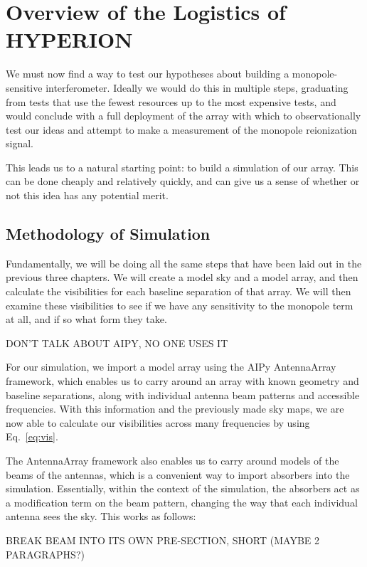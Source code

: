 \chapter{Overview of the Logistics of HYPERION}
\label{chap:logistics}

We must now find a way to test our hypotheses about building a 
monopole-sensitive interferometer. Ideally we would do this in multiple steps, 
graduating from tests that use the fewest resources up to the most expensive 
tests, and would conclude with a full deployment of the array with which to 
observationally test our ideas and attempt to make a measurement of the 
monopole reionization signal. 

This leads us to a natural starting point: to build a simulation of our array.  
This can be done cheaply and relatively quickly, and can give us a sense of 
whether or not this idea has any potential merit.

\section{Methodology of Simulation}

Fundamentally, we will be doing all the same steps that have been laid out in 
the previous three chapters. We will create a model sky and a model array, and 
then calculate the visibilities for each baseline separation of that array. We 
will then examine these visibilities to see if we have any sensitivity to the 
monopole term at all, and if so what form they take.

DON'T TALK ABOUT AIPY, NO ONE USES IT

For our simulation, we import a model array using the AIPy AntennaArray 
framework, which enables us to carry around an array with known geometry and 
baseline separations, along with individual antenna beam patterns and 
accessible frequencies. With this information and the previously made sky maps, 
we are now able to calculate our visibilities across many frequencies by using 
Eq.~\eqref{eq:vis}.

The AntennaArray framework also enables us to carry around models of the beams 
of the antennas, which is a convenient way to import absorbers into the 
simulation. Essentially, within the context of the simulation, the absorbers 
act as a modification term on the beam pattern, changing the way that each 
individual antenna sees the sky. This works as follows:

BREAK BEAM INTO ITS OWN PRE-SECTION, SHORT (MAYBE 2 PARAGRAPHS?)

